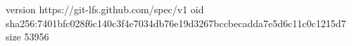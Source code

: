 version https://git-lfs.github.com/spec/v1
oid sha256:7401bfc028f6c140c3f4e7034db76e19d3267bccbecadda7e5d6c11c0c1215d7
size 53956
